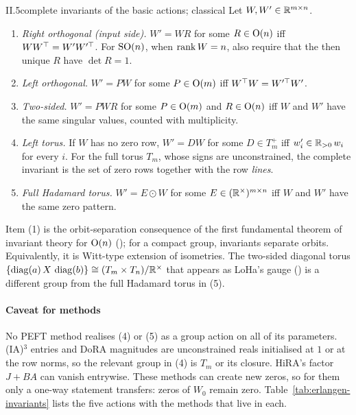 \begin{theorem}{II.5}{complete invariants of the basic actions; classical}
Let $W,W'\in\mathbb{R}^{m\times n}$.
\begin{enumerate}[label=(\arabic*)]
  \item \emph{Right orthogonal (input side).} $W'=WR$ for some $R\in\mathrm{O}(n)$ iff $WW^{\top}=W'W'^{\top}$. For $\mathrm{SO}(n)$, when
    $\operatorname{rank} W=n$, also require that the then unique $R$ have $\det R=1$.
  \item \emph{Left orthogonal.} $W'=PW$ for some $P\in\mathrm{O}(m)$ iff $W^{\top} W=W'^{\top}W'$.
  \item \emph{Two-sided.} $W'=PWR$ for some $P\in\mathrm{O}(m)$ and $R\in\mathrm{O}(n)$ iff $W$ and $W'$ have the same singular
    values, counted with multiplicity.
  \item \emph{Left torus.} If $W$ has no zero row, $W'=DW$ for some $D\in T_m^+$ iff $w_i'\in\mathbb{R}_{>0}\,w_i$ for every $i$.
    For the full torus $T_m$, whose signs are unconstrained, the complete invariant is the set of zero rows together with
    the row \emph{lines}.
  \item \emph{Full Hadamard torus.} $W'=E\odot W$ for some $E\in(\mathbb{R}^\times)^{m\times n}$ iff $W$ and $W'$ have the same
    zero pattern.
\end{enumerate}
\end{theorem}

Item (1) is the orbit-separation consequence of the first fundamental theorem of invariant theory for $\mathrm{O}(n)$
(); for a compact group, invariants separate orbits. Equivalently, it is Witt-type extension of isometries.
The two-sided diagonal torus $\{\operatorname{diag}(a)\,X\,\operatorname{diag}(b)\}\cong(T_m\times T_n)/\mathbb{R}^\times$ that appears as LoHa's gauge
() is a different group from the full Hadamard torus in (5).

\paragraph{Caveat for methods}
No PEFT method realises (4) or (5) as a group action on all of its parameters. (IA)$^3$ entries and DoRA magnitudes are
unconstrained reals initialised at $1$ or at the row norms, so the relevant group in (4) is $T_m$ or its closure.
HiRA's factor $J+BA$ can vanish entrywise. These methods can create new zeros, so for them only a one-way statement
transfers: zeros of $W_0$ remain zero. Table~\ref{tab:erlangen-invariants} lists the five actions with the methods that
live in each.

